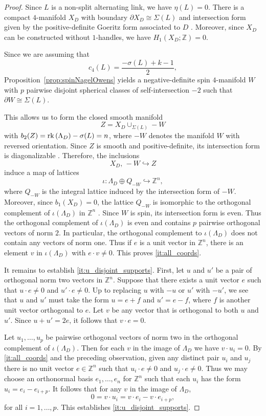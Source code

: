 \documentclass[a4paper,11pt]{amsart}
\theoremstyle{definition}
\theoremstyle{remark}
\numberwithin{equation}{section}
\newcommand{\Z}{\mathbb{Z}}
\newcommand{\rk}{{\rm rk}\,}
\begin{document}
\begin{proof}
    Since $L$ is a non-split alternating link, we have $\eta(L)=0$.
There is a compact $4$-manifold $X_D$ with boundary $\partial X_D \cong \Sigma(L)$ and intersection form given by the positive-definite Goeritz form associated to $D$ \cite[Section~3]{ozsvath2005heegaard}. Moreover, since $X_D$ can be constructed without $1$-handles, we have $H_1(X_D;\Z)=0$.

Since we are assuming that
\[
c_4(L)=\frac{-\sigma(L)+k-1}{2},
\]
Proposition~\ref{prop:spinNagelOwens} yields a negative-definite spin $4$-manifold $W$ with $p$ pairwise disjoint spherical classes of self-intersection $-2$ such that $\partial W \cong \Sigma(L)$.

This allows us to form the closed smooth manifold
\[
Z=X_D\cup_{\Sigma(L)} -W
\]
with $b_2(Z)=\rk(\Lambda_D)-\sigma(L)=n$, where $-W$ denotes the manifold $W$ with reversed orientation.
Since $Z$ is smooth and positive-definite, its intersection form is diagonalizable \cite{Donaldson:1987-1}. Therefore, the inclusions
\[
X_D,\,-W \hookrightarrow Z
\]
induce a map of lattices
\[
\iota:\Lambda_D \oplus Q_{-W} \hookrightarrow \Z^{n},
\]
where $Q_{-W}$ is the integral lattice induced by the intersection form of $-W$.
Moreover, since $b_1(X_D)=0$, the lattice $Q_{-W}$ is isomorphic to the orthogonal complement of $\iota(\Lambda_D)$ in $\Z^{n}$ \cite[Lemma~2.4]{Aceto-McCoy-Park:2022}. Since $W$ is spin, its intersection form is even. Thus the orthogonal complement of $\iota(\Lambda_D)$ is even and contains $p$ pairwise orthogonal vectors of norm $2$. In particular, the orthogonal complement to $\iota(\Lambda_D)$ does not contain any vectors of norm one. Thus if $e$ is a unit vector in $\Z^{n}$, there is an element $v$ in $\iota(\Lambda_D)$ with $e\cdot v\neq 0$. This proves \eqref{it:all_coords}.
    
    
    It remains to establish \eqref{it:u_disjoint_supports}. First, let $u$ and $u'$ be a pair of orthogonal norm two vectors in $\Z^n$. Suppose that there exists a unit vector $e$ such that $u\cdot e\neq 0$ and $u'\cdot e\neq 0$. Up to replacing $u$ with $-u$ or $u'$ with $-u'$, we see that $u$ and $u'$ must take the form $u=e+f$ and $u'=e-f$, where $f$ is another unit vector orthogonal to $e$. Let $v$ be any vector that is orthogonal to both $u$ and $u'$. Since $u+u'=2e$, it follows that $v\cdot e=0$.
    
    Let $u_1,\dots,u_p$ be pairwise orthogonal vectors of norm two in the orthogonal complement of $\iota(\Lambda_D)$. Then for each $v$ in the image of $\Lambda_D$ we have $v\cdot u_i=0$. By \eqref{it:all_coords} and the preceding observation, given any distinct pair $u_i$ and $u_j$ there is no unit vector $e\in \Z^n$ such that $u_i\cdot e\neq 0$ and $u_j\cdot e\neq 0$. Thus we may choose an orthonormal basis $e_1,\dots,e_n$ for $\Z^n$ such that each $u_i$ has the form $u_i=e_i-e_{i+p}$. It follows that for any $v$ in the image of $\Lambda_D$,
\[
0=v\cdot u_i = v\cdot e_i - v\cdot e_{i+p},
\]
for all $i=1,\dots,p$. This establishes \eqref{it:u_disjoint_supports}.
\end{proof}
    
\end{document}
